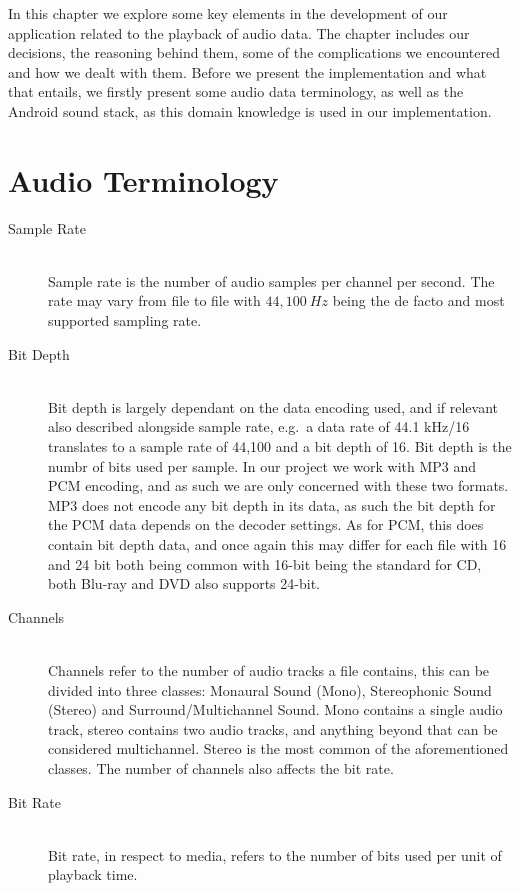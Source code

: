 In this chapter we explore some key elements in the development of our application related to the playback of audio data.
The chapter includes our decisions, the reasoning behind them, some of the complications we encountered and how we dealt with them.
Before we present the implementation and what that entails, we firstly present some audio data terminology, as well as the Android sound stack, as this domain knowledge is used in our implementation.

\section{Audio Terminology}
\begin{description}
    \item [Sample Rate]\cite{sample_rate_std} \hfill \\
    Sample rate is the number of audio samples per channel per second.
    The rate may vary from file to file with $44,100\ Hz$ being the de facto and most supported sampling rate.
    \item [Bit Depth]\cite{bit_depth} \hfill \\
    Bit depth is largely dependant on the data encoding used, and if relevant also described alongside sample rate, e.g.\ a data rate of 44.1 kHz/16 translates to a sample rate of 44,100 and a bit depth of 16.
    Bit depth is the numbr of bits used per sample.
    In our project we work with MP3 and PCM encoding, and as such we are only concerned with these two formats.
    MP3 does not encode any bit depth in its data, as such the bit depth for the \ac{PCM} data depends on the decoder settings.
    As for PCM, this does contain bit depth data, and once again this may differ for each file with 16 and 24 bit both being common with 16-bit being the standard for CD, both Blu-ray and DVD also supports 24-bit.
    \item [Channels]\cite{channels} \hfill \\
    Channels refer to the number of audio tracks a file contains, this can be divided into three classes: Monaural Sound (Mono), Stereophonic Sound (Stereo) and Surround/Multichannel Sound.
    Mono contains a single audio track, stereo contains two audio tracks, and anything beyond that can be considered multichannel.
    Stereo is the most common of the aforementioned classes.
    The number of channels also affects the bit rate.
    \item [Bit Rate]\cite{bit_rate} \hfill \\
    Bit rate, in respect to media, refers to the number of bits used per unit of playback time.

\end{description}
